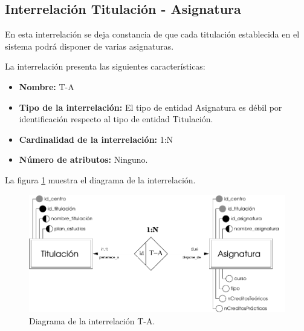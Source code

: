 \subsection{Interrelación Titulación - Asignatura}

   \begin{description}
      \item[Definición] En esta interrelación se deja constancia de que cada
      titulación establecida en el sistema podrá disponer de varias asignaturas.

      \item[Características] La interrelación presenta las siguientes
                             características:

         \begin{itemize}
            \item \textbf{Nombre:} T-A
            \item \textbf{Tipo de la interrelación:} El tipo de entidad
                  Asignatura es débil por identificación respecto al tipo de
                  entidad Titulación.
            \item \textbf{Cardinalidad de la interrelación:} 1:N
            \item \textbf{Número de atributos:} Ninguno.
         \end{itemize}

      \item[Diagrama] La figura \ref{diagramaT-A} muestra el diagrama de la
                      interrelación.

      \item \begin{figure}[!ht]
            \begin{center}
            \includegraphics[]{07.Modelo_Entidad-Interrelacion/7.3.Analisis_Interrelaciones/diagramas/T-A.pdf}
            \caption{Diagrama de la interrelación T-A.}
            \label{diagramaT-A}
            \end{center}
         \end{figure}


\end{description}
